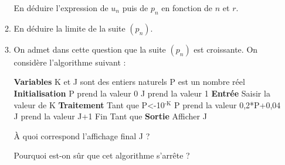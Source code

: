 \documentclass[12pt,a4paper,french]{article}
\begin{document}
\begin{question}[subtitle={D'après Bac (Pondichéry - 2013)}]
\begin{enumerate}
\begin{enumerate}
          En déduire l'expression de $u_n$ puis de $p_n$ en fonction de $n$
          et $r$.
        \item En déduire la limite de la suite $(p_n)$.
        \item On admet dans cette question que la suite $(p_n)$ est
          croissante. On considère l'algorithme  suivant :

          \begin{center}
            \begin{oldalgorithme}
              \textbf{Variables}
              K et J sont des entiers naturels
              P est un nombre réel
              \textbf{Initialisation}
              P prend la valeur 0
              J prend la valeur 1
              \textbf{Entrée}
              Saisir la valeur de K
              \textbf{Traitement}
              Tant que P<-10$^\textrm{-K}$
              P prend la valeur 0,2*P+0,04
              J prend la valeur J+1
              Fin Tant que
              \textbf{Sortie}
              Afficher J
            \end{oldalgorithme}
          \end{center}

          À quoi correspond l'affichage final J ?

          Pourquoi est-on sûr que cet algorithme s'arrête ?
    \end{enumerate}
  \end{enumerate}

\end{question}

\newpage


\bigskip

\printsolutions
\end{document}

